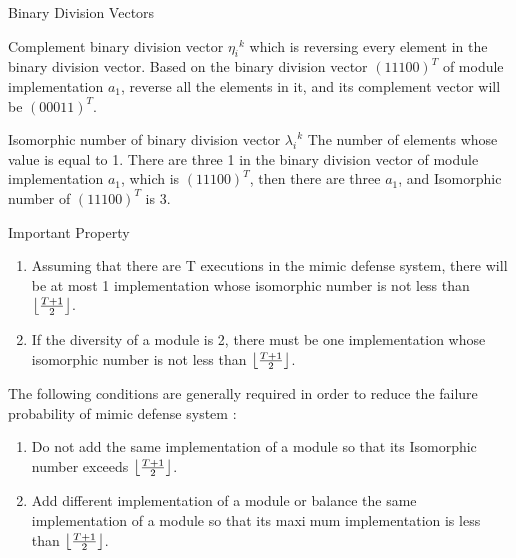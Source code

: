 \documentclass{beamer}
\DeclarePairedDelimiter\floor{\lfloor}{\rfloor}
\begin{document}
\begin{frame}{Binary Division Vectors}
    \begin{block}{Complement binary division vector \texttildelow ${\eta_{i}}^k$} 
        which is reversing every element in the binary division vector. Based on the binary division vector $(11100)^T$ of module implementation $a_1$, reverse all the elements in it, and its complement vector will be $(00011)^T$.
    \end{block}
    \begin{block}{Isomorphic number of binary division vector ${\lambda_{i}}^k$}
        The number of elements whose value is equal to 1. There are three 1 in the binary division vector of module implementation $a_{1}$, which is $(11100)^T$, then there are three $a_{1}$, and Isomorphic number of $(11100)^T$ is 3.
    \end{block}
\end{frame}
\begin{frame}{Important Property}
    \begin{block}{}
        \begin{enumerate}
            \item Assuming that there are T executions in the mimic defense system, there will be at most 1 implementation whose isomorphic number is not less than $\floor*{\frac{T+1}{2}}$. \item If the diversity of a module is 2, there must be one implementation whose isomorphic number is not less than $\floor*{\frac{T+1}{2}}$. 
        \end{enumerate}
    \end{block}
        \begin{block}{}
        The following conditions are generally required in order to reduce the failure probability of mimic defense system :
        \begin{enumerate}
            \item Do not add the same implementation of a module so that its Isomorphic number exceeds $\floor*{\frac{T+1}{2}}$.
            \item Add different implementation of a module or balance the same implementation of a module so that its maximum implementation is less than $\floor*{\frac{T+1}{2}}$.
        \end{enumerate}
    \end{block}
 \end{frame}
\end{document}
